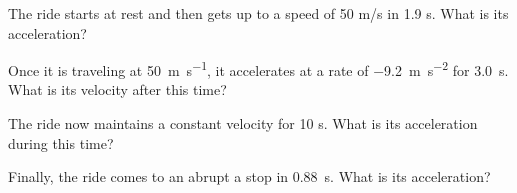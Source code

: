 \documentclass[10pt]{exam}
\begin{document}
\begin{questions}
  \question
    The ride starts at rest and then gets up to a speed of 50 m/s in 1.9 s.  What is its acceleration?
    \vs

  \question
    Once it is traveling at \SI{50}{\meter\per\second}, it accelerates at a rate of \SI{-9.2}{\meter\per\second^2} for \SI{3.0}{\second}.  What is its velocity after this time?
    \vs

  \question
    The ride now maintains a constant velocity for 10 s.  What is its acceleration during this time?
    \vs

  \question
    Finally, the ride comes to an abrupt a stop in \SI{0.88}{\second}. What is its acceleration?
    \vs


 
\end{questions}
\end{document}
